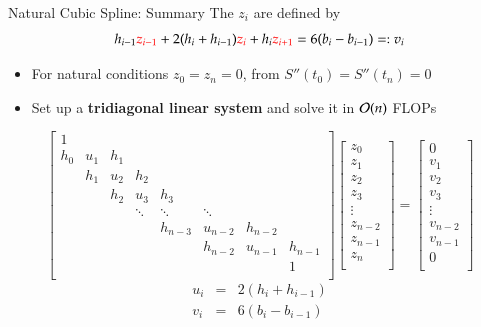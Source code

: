 \documentclass[10pt]{beamer}
\begin{document}
\begin{frame}{Natural Cubic Spline: Summary}
The $z_i$ are defined by
\begin{equation*}
  h_{i-1}\textcolor{red}{z_{i-1}} + 2(h_i+h_{i-1})\textcolor{red}{z_i} + h_{i}\textcolor{red}{z_{i+1}} = 6(b_i-b_{i-1}) =: v_i
\end{equation*}
   \vspace{-10pt}
\begin{itemize}
  \item For natural conditions $z_0=z_n=0$, from $S''(t_0)=S''(t_n)=0$ 
  \item Set up a \textbf{tridiagonal linear system} and solve it in ${\mathcal{O}}(n)$ FLOPs
\end{itemize}
\[
\begin{bmatrix}
 1 &  & & & & & & \\ 
 h_0 & u_1  & h_1 & & & & & \\ 
 & h_1            &  u_2 & h_2 & & & & \\ 
 &                & h_2             & u_3 & h_3  & & & \\ 
 &                &                 & \ddots  & \ddots & \ddots & & \\  
 &  &   &   & h_{n-3} & u_{n-2} & h_{n-2}  & \\ 
 &  &   &   &         & h_{n-2} &  u_{n-1}& h_{n-1}\\
 &  &   &   &         &         &        & 1\\
\end{bmatrix}
\begin{bmatrix}
z_0\\z_1\\  z_2\\  z_3\\  \vdots\\  z_{n-2}\\  z_{n-1}\\z_n\\
\end{bmatrix}
 = 
\begin{bmatrix}
0\\v_1\\  v_2\\  v_3\\  \vdots\\  v_{n-2}\\  v_{n-1}\\0\\
\end{bmatrix}
\] 
\begin{eqnarray*}
u_i & = & 2 (h_i + h_{i-1} ) \\
v_i & = & 6(b_i - b_{i-1})
\end{eqnarray*} 
\end{frame}
\end{document}
